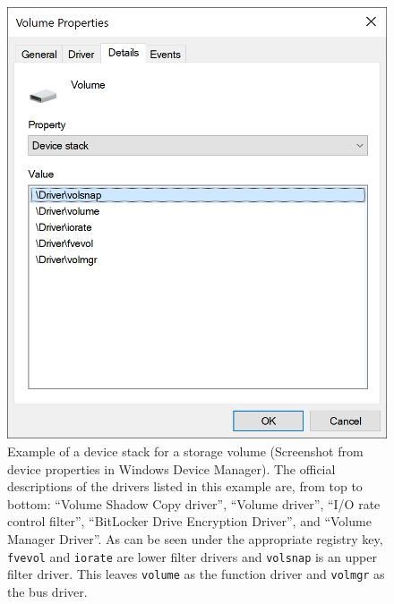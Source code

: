 \begin{figure}[htb!]
	\center
	\includegraphics[scale=0.7]{../img/background.kerneldriver.devicestack.png}
	\caption[
		Example of a device stack for a storage volume
	]{
		Example of a device stack for a storage volume (Screenshot from device properties in Windows Device Manager). The official descriptions of the drivers listed in this example are, from top to bottom: ``Volume Shadow Copy driver'', ``Volume driver'', ``I/O rate control filter'', ``BitLocker Drive Encryption Driver'', and ``Volume Manager Driver''. As can be seen under the appropriate registry key\footnotemark, \texttt{fvevol} and \texttt{iorate} are lower filter drivers and \texttt{volsnap} is an upper filter driver. This leaves \texttt{volume} as the function driver and \texttt{volmgr} as the bus driver.
	}
	\label{fig:background.kerneldriver.devicestack}
\end{figure}

